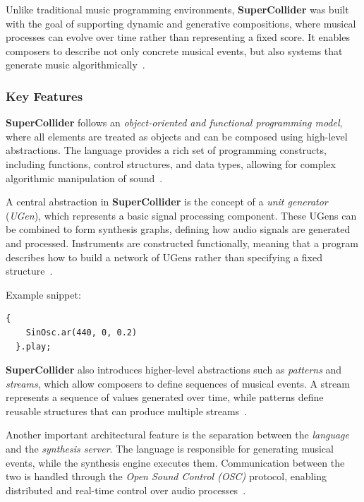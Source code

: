 Unlike traditional music programming environments, \textbf{SuperCollider} was built with the goal of supporting dynamic
and generative compositions, where musical processes can evolve over time rather than representing a fixed score.
It enables composers to describe not only concrete musical events, but also systems that generate music
algorithmically~\cite{McCartney_2002}.


\subsubsection{Key Features}

\textbf{SuperCollider} follows an \textit{object-oriented and functional programming model}, where all
elements are treated as objects and can be composed using high-level abstractions.
The language provides a rich set of programming constructs, including functions, control structures, and data types,
allowing for complex algorithmic manipulation of sound~\cite{McCartney_2002}.

A central abstraction in \textbf{SuperCollider} is the concept of a \textit{unit generator} (\textit{UGen}),
which represents a basic signal processing component.
These UGens can be combined to form synthesis graphs, defining how audio signals are generated and processed.
Instruments are constructed functionally, meaning that a program describes how to build a network of UGens rather than
specifying a fixed structure~\cite{McCartney_2002}.

Example snippet:

\begin{lstlisting}[label={detail-lst:supercollider-1}]
  {
    SinOsc.ar(440, 0, 0.2)
  }.play;
\end{lstlisting}

\textbf{SuperCollider} also introduces higher-level abstractions such as \textit{patterns} and \textit{streams}, which
allow composers to define sequences of musical events.
A stream represents a sequence of values generated over time, while patterns define reusable structures that can produce
multiple streams~\cite{McCartney_2002}.

Another important architectural feature is the separation between the \textit{language} and the
\textit{synthesis server}.
The language is responsible for generating musical events, while the synthesis engine executes them.
Communication between the two is handled through the \textit{Open Sound Control (OSC)} protocol, enabling distributed
and real-time control over audio processes~\cite{McCartney_2002}.

